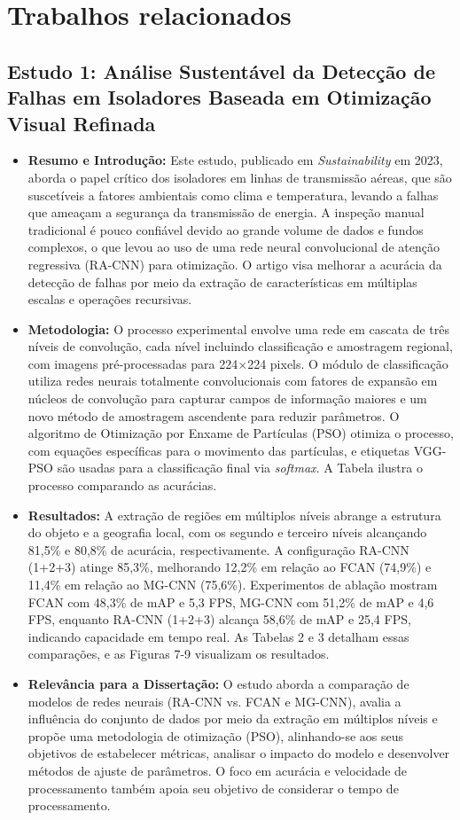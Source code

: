 \chapter{Trabalhos relacionados}

\section{Estudo 1: Análise Sustentável da Detecção de Falhas em Isoladores Baseada em Otimização Visual Refinada}
\begin{itemize}
    \item \textbf{Resumo e Introdução:} Este estudo, publicado em \textit{Sustainability} em 2023, aborda o papel crítico dos isoladores em linhas de transmissão aéreas, que são suscetíveis a fatores ambientais como clima e temperatura, levando a falhas que ameaçam a segurança da transmissão de energia. A inspeção manual tradicional é pouco confiável devido ao grande volume de dados e fundos complexos, o que levou ao uso de uma rede neural convolucional de atenção regressiva (RA-CNN) para otimização. O artigo visa melhorar a acurácia da detecção de falhas por meio da extração de características em múltiplas escalas e operações recursivas.
    \item \textbf{Metodologia:} O processo experimental envolve uma rede em cascata de três níveis de convolução, cada nível incluindo classificação e amostragem regional, com imagens pré-processadas para 224$\times$224 pixels. O módulo de classificação utiliza redes neurais totalmente convolucionais com fatores de expansão em núcleos de convolução para capturar campos de informação maiores e um novo método de amostragem ascendente para reduzir parâmetros. O algoritmo de Otimização por Enxame de Partículas (PSO) otimiza o processo, com equações específicas para o movimento das partículas, e etiquetas VGG-PSO são usadas para a classificação final via \textit{softmax}. A Tabela ilustra o processo comparando as acurácias.
    \item \textbf{Resultados:} A extração de regiões em múltiplos níveis abrange a estrutura do objeto e a geografia local, com os segundo e terceiro níveis alcançando 81,5\% e 80,8\% de acurácia, respectivamente. A configuração RA-CNN (1+2+3) atinge 85,3\%, melhorando 12,2\% em relação ao FCAN (74,9\%) e 11,4\% em relação ao MG-CNN (75,6\%). Experimentos de ablação mostram FCAN com 48,3\% de mAP e 5,3 FPS, MG-CNN com 51,2\% de mAP e 4,6 FPS, enquanto RA-CNN (1+2+3) alcança 58,6\% de mAP e 25,4 FPS, indicando capacidade em tempo real. As Tabelas 2 e 3 detalham essas comparações, e as Figuras 7-9 visualizam os resultados.
    \item \textbf{Relevância para a Dissertação:} O estudo aborda a comparação de modelos de redes neurais (RA-CNN vs. FCAN e MG-CNN), avalia a influência do conjunto de dados por meio da extração em múltiplos níveis e propõe uma metodologia de otimização (PSO), alinhando-se aos seus objetivos de estabelecer métricas, analisar o impacto do modelo e desenvolver métodos de ajuste de parâmetros. O foco em acurácia e velocidade de processamento também apoia seu objetivo de considerar o tempo de processamento.
\end{itemize}

